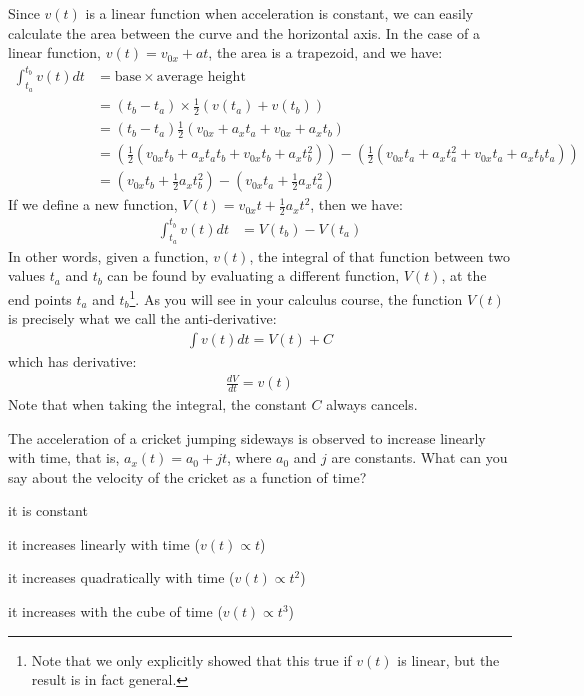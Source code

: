 
Since $v(t)$ is a linear function when acceleration is constant, we can easily calculate the area between the curve and the horizontal axis. In the case of a linear function, $v(t)=v_{0x}+at$, the area is a trapezoid, and we have:
\begin{align*}
\int_{t_a}^{t_b}v(t) dt &= \text{base}\times\text{average height}\\
&=(t_b-t_a)\times\frac{1}{2}\left(v(t_a)+v(t_b)\right)\\
&=(t_b-t_a)\frac{1}{2}(v_{0x}+a_xt_a+v_{0x}+a_xt_b)\\
&=\left( \frac{1}{2}(v_{0x}t_b+a_xt_at_b+v_{0x}t_b+a_xt_b^2)  \right)- \left( \frac{1}{2}(v_{0x}t_a+a_xt_a^2+v_{0x}t_a+a_xt_bt_a) \right)\\
&=\left( v_{0x}t_b+\frac{1}{2}a_xt_b^2 \right)-\left( v_{0x}t_a+\frac{1}{2}a_xt_a^2 \right)
\end{align*}
If we define a new function, $V(t)=v_{0x}t+\frac{1}{2}a_xt^2$, then we have:
\begin{align*}
\int_{t_a}^{t_b}v(t) dt &= V(t_b) -V(t_a)
\end{align*}
In other words, given a function, $v(t)$, the integral of that function between two values $t_a$ and $t_b$ can be found by evaluating a different function, $V(t)$, at the end points $t_a$ and $t_b$\footnote{Note that we only explicitly showed that this true if $v(t)$ is linear, but the result is in fact general.}. As you will see in your calculus course, the function $V(t)$ is precisely what we call the anti-derivative:
\begin{align*}
\int v(t) dt= V(t) + C
\end{align*}
which has derivative:
\begin{align*}
\frac{dV}{dt}=v(t)
\end{align*}
Note that when taking the integral, the constant $C$ always cancels.  
\begin{checkpointMC}{The acceleration of a cricket jumping sideways is observed to increase linearly with time, that is, $a_x(t)=a_0+jt$, where $a_0$ and $j$ are constants. What can you say about the velocity of the cricket as a function of time?}
\item it is constant
\item it increases linearly with time ($v(t)\propto t$)
\item it increases quadratically with time ($v(t)\propto t^2$) %
\item it increases with the cube of time ($v(t)\propto t^3$)
\end{checkpointMC}


